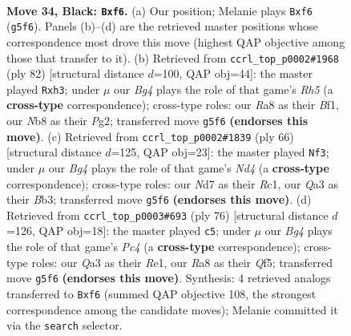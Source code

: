 \documentclass[11pt]{article}
\begin{document}
\clearpage

\begin{figure}[p]\centering
\begin{subfigure}{0.46\textwidth}\centering
\resizebox{\linewidth}{!}{%
\newchessgame
\chessboard[
  setfen={rnR5/3n2k1/p2p1P2/3P2b1/6P1/q1NQ4/4N3/4K3 b - - 0 34},
  showmover=false,
  pgfstyle=straightmove, color=movearrow, markmove={g5-f6}
]}
\caption{}
\end{subfigure}\hfill
\begin{subfigure}{0.46\textwidth}\centering
\resizebox{\linewidth}{!}{%
\newchessgame
\chessboard[
  setfen={1r4k1/5pp1/1p6/7R/3N4/P4Nqn/1Q3nP1/5BK1 w - - 0 42},
  showmover=false,
  pgfstyle=straightmove, color=movearrow, markmove={h5-h3}
]}
\caption{}
\end{subfigure}
\\[4pt]
\begin{subfigure}{0.46\textwidth}\centering
\resizebox{\linewidth}{!}{%
\newchessgame
\chessboard[
  setfen={3q1nk1/1p3pp1/7p/r2nQP2/3N4/1B2P3/6PP/2R3K1 w - - 8 34},
  showmover=false,
  pgfstyle=straightmove, color=movearrow, markmove={d4-f3}
]}
\caption{}
\end{subfigure}\hfill
\begin{subfigure}{0.46\textwidth}\centering
\resizebox{\linewidth}{!}{%
\newchessgame
\chessboard[
  setfen={4b1k1/4rNp1/pq3n1p/4NQ2/2P5/7P/6PK/4R3 w - - 1 39},
  showmover=false,
  pgfstyle=straightmove, color=movearrow, markmove={c4-c5}
]}
\caption{}
\end{subfigure}
\caption{\textbf{Move 34, Black: \texttt{Bxf6}.} (a) Our position; Melanie plays \texttt{Bxf6} (\texttt{g5f6}). Panels (b)--(d) are the retrieved master positions whose correspondence most drove this move (highest QAP objective among those that transfer to it). (b) Retrieved from \texttt{ccrl\_top\_p0002\#1968} (ply 82) [structural distance $d$=100, QAP obj=44]: the master played \texttt{Rxh3}; under $\mu$ our \emph{Bg4} plays the role of that game's \emph{Rh5} (a \textbf{cross-type} correspondence); cross-type roles: our \emph{R}a8 as their \emph{B}f1, our \emph{N}b8 as their \emph{P}g2; transferred move \texttt{g5f6} \textbf{(endorses this move)}. (c) Retrieved from \texttt{ccrl\_top\_p0002\#1839} (ply 66) [structural distance $d$=125, QAP obj=23]: the master played \texttt{Nf3}; under $\mu$ our \emph{Bg4} plays the role of that game's \emph{Nd4} (a \textbf{cross-type} correspondence); cross-type roles: our \emph{N}d7 as their \emph{R}c1, our \emph{Q}a3 as their \emph{B}b3; transferred move \texttt{g5f6} \textbf{(endorses this move)}. (d) Retrieved from \texttt{ccrl\_top\_p0003\#693} (ply 76) [structural distance $d$=126, QAP obj=18]: the master played \texttt{c5}; under $\mu$ our \emph{Bg4} plays the role of that game's \emph{Pc4} (a \textbf{cross-type} correspondence); cross-type roles: our \emph{Q}a3 as their \emph{R}e1, our \emph{R}a8 as their \emph{Q}f5; transferred move \texttt{g5f6} \textbf{(endorses this move)}. Synthesis: 4 retrieved analogs transferred to \texttt{Bxf6} (summed QAP objective 108, the strongest correspondence among the candidate moves); Melanie committed it via the \texttt{search} selector.}
\label{fig:thought-m67}
\end{figure}
\end{document}
